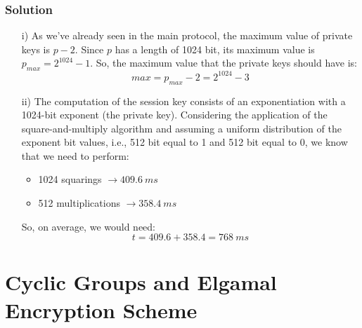 \subsubsection*{Solution}
\begin{itemize}
    \item[i)] As we've already seen in the main protocol, the maximum value of private keys is $p-2$. Since $p$ has a length of 1024 bit, its maximum value is $p_{max}=2^{1024}-1$. So, the maximum value that the private keys should have is:
    $$max=p_{max}-2=2^{1024}-3$$
    \item[ii)] The computation of the session key consists of an exponentiation with a 1024-bit exponent (the private key). Considering the application of the square-and-multiply algorithm and assuming a uniform distribution of the exponent bit values, i.e., 512 bit equal to 1 and 512 bit equal to 0, we know that we need to perform:
    \begin{itemize}
        \item 1024 squarings $\longrightarrow409.6\ ms$
        \item 512 multiplications $\longrightarrow358.4\ ms$
    \end{itemize}
    So, on average, we would need:
    $$t=409.6+358.4=768\ ms$$
\end{itemize}

\newpage
\section{Cyclic Groups and Elgamal Encryption Scheme}
